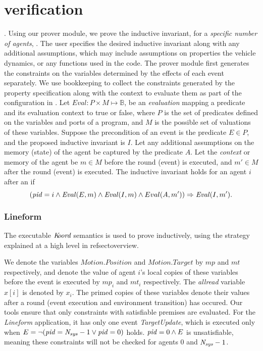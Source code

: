 \section{verification}
\label{sec:verification}
. Using our \K prover module, we prove the inductive invariant, for a \emph{specific number of agents}, . The user specifies the desired inductive invariant along with any additional assumptions, which may include assumptions on properties the vehicle dynamics, or any functions used in the code. The prover module first generates the constraints on the variables determined by the effects of each event separately. We use bookkeeping to collect the constraints generated by the property specification along with the context to evaluate them as part of the configuration in \K. Let $\mathit{Eval} : P \times M  \mapsto \mathbb{B} $, be an \emph{evaluation} mapping a predicate and its evaluation context to true or false,  where $P$ is  the set of predicates defined on the variables and ports of a program, and $M$ is the possible set of valuations of these variables. Suppose the precondition of an event is the predicate $E \in P$, and the proposed inductive invariant is $I$. Let any additional assumptions on the memory (state) of the agent be captured by the predicate $A$. Let the \emph{context} or memory of the agent be $m\in M$ before the round (event) is executed, and $m'\in M$ after the round (event) is executed. The inductive invariant holds for an agent $i$ after an if
            $$(\mathit{pid} = i \wedge \mathit{Eval}(E,m)\wedge \mathit{Eval}(I,m)\wedge Eval(A,m'))\Rightarrow \mathit{Eval}(I,m').$$


\subsubsection*{Lineform}
The executable $\emph{K\kern-2pt oord}$ semantics is used to prove  inductively, using the strategy explained at a high level in refsect{overview}.



We denote the variables $\mathit{Motion.Position}$ and $\mathit{Motion.Target}$ by $\mathit{mp}$ and $\mathit{mt}$ respectively,  and denote the value of agent $i$'s local copies of these variables before the event is executed by $\mathit{mp}_i$ and $\mathit{mt}_i$ respectively. The \emph{allread} variable $x[i]$ is denoted by $x_i$. The primed copies of these variables denote their values after a round (event execution and environment transition) has occured. Our tools ensure that only constraints with satisfiable premises are evaluated. For the \emph{Lineform} application, it has only one event \emph{TargetUpdate}, which is executed only when $E =\neg (\mathit{pid} = \mathit{N_{sys}} - 1 \vee \mathit{pid} = 0)$ holds. $\mathit{pid} = 0 \wedge E$ is unsatisfiable, meaning these constraints will not be checked for agents $0$ and $\mathit{N_{sys}} - 1$.

